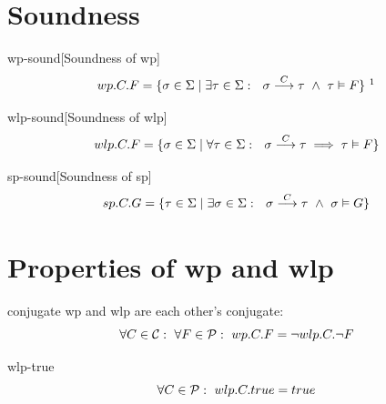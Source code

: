 \section{Soundness}
\begin{theorem}{wp-sound}[Soundness of wp]~{\normalfont\cite{zhang22}} 
\ \vspace{-1.5mm}
\[
wp.C.F = \{\sigma\in\S \mid  \exists \tau\in\S:\ \ \sigma\goto{C}\tau\ \wedge\ \tau\vDash F\}
~\protect\footnotemark
\]
\end{theorem}

\begin{theorem}{wlp-sound}[Soundness of wlp]~{\normalfont\cite{dijkstra90}}
\ \vspace{-1.5mm}
\[
wlp.C.F = \{ \sigma\in\S \mid
\forall \tau\in\S:\ \ \sigma\goto{C}\tau\implies  \tau\vDash F
 \}
\]
\end{theorem}

\begin{theorem}{sp-sound}[Soundness of sp]~{\normalfont\cite{vries11,zhang22}}
\ \vspace{-1.5mm}
\[
sp.C.G = \{ \tau\in\S \mid \exists \sigma\in\S:\ \ \sigma\goto{C}\tau\ \wedge\ \sigma\vDash G\}
\]
\label{thm:sp}
\end{theorem}


\section{Properties of wp and wlp}
\begin{theorem}{conjugate}%
  wp and wlp are each other's conjugate: 
  \[\forall C\in\C:\ \forall F\in\P:\ wp.C.F = \neg wlp.C.\neg F\]
\end{theorem}
\begin{theorem}{wlp-true}
  \[\forall C\in\P:\ wlp.C.true = true\]
\end{theorem}




